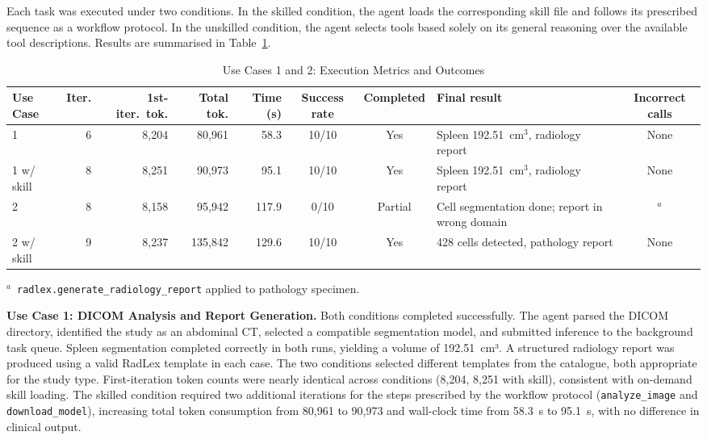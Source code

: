 \documentclass[conference]{IEEEtran}
\begin{document}
Each task was executed under two conditions. In the skilled condition, the agent loads the corresponding skill file and follows its prescribed sequence as a workflow protocol. In the unskilled condition, the agent selects tools based solely on its general reasoning over the available tool descriptions. Results are summarised in Table~\ref{tab:uc1-results}.

\begin{table}[t]
  \caption{Use Cases 1 and 2: Execution Metrics and Outcomes}
  \label{tab:uc1-results}
  \centering
  \small
  \begin{tabular}{lrrrrccp{4cm}c}
    \toprule
    Use Case & Iter. & 1st-iter.\ tok. & Total tok. & Time (s) & Success rate & Completed & Final result & Incorrect calls \\
    \midrule
    1               & 6 & 8{,}204  & 80{,}961  & 58.3  & 10/10 & Yes     & Spleen 192.51~cm$^{3}$, radiology report       & None \\
    1 w/ skill      & 8 & 8{,}251  & 90{,}973  & 95.1  & 10/10 & Yes     & Spleen 192.51~cm$^{3}$, radiology report       & None \\
    2               & 8 & 8{,}158  & 95{,}942  & 117.9 & 0/10  & Partial & Cell segmentation done; report in wrong domain & $^{a}$ \\
    2 w/ skill      & 9 & 8{,}237  & 135{,}842 & 129.6 & 10/10 & Yes     & 428 cells detected, pathology report           & None \\
    \bottomrule
  \end{tabular}
  \par\smallskip
  \raggedright\footnotesize
  $^{a}$~\texttt{radlex.generate\_radiology\_report} applied to pathology specimen.
\end{table}

\textbf{Use Case 1: DICOM Analysis and Report Generation.}
Both conditions completed successfully. The agent parsed the DICOM directory, identified the study as an abdominal CT, selected a compatible segmentation model, and submitted inference to the background task queue. Spleen segmentation completed correctly in both runs, yielding a volume of 192.51~cm³. A structured radiology report was produced using a valid RadLex template in each case. The two conditions selected different templates from the catalogue, both appropriate for the study type. First-iteration token counts were nearly identical across conditions (8,204, 8,251 with skill), consistent with on-demand skill loading. The skilled condition required two additional iterations for the steps prescribed by the workflow protocol (\texttt{analyze\_image} and \texttt{download\_model}), increasing total token consumption from 80,961 to 90,973 and wall-clock time from 58.3~s to 95.1~s, with no difference in clinical output.
\end{document}
